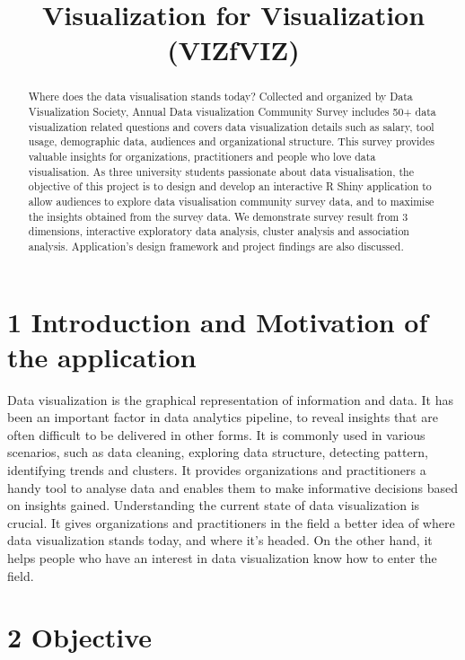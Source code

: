 \documentclass{acm_proc_article-sp}
\title{Visualization for Visualization (VIZfVIZ)}
\author{
\alignauthor Xinyue Bai \\
        \affaddr{}\\
       \email{}
\and \alignauthor Weimin Zhang \\
        \affaddr{}\\
       \email{}
\and \alignauthor Hongting Li \\
        \affaddr{}\\
       \email{}
\and }
\date{}
\begin{document}
\maketitle

\begin{abstract}
Where does the data visualisation stands today? Collected and organized
by Data Visualization Society, Annual Data visualization Community
Survey includes 50+ data visualization related questions and covers data
visualization details such as salary, tool usage, demographic data,
audiences and organizational structure. This survey provides valuable
insights for organizations, practitioners and people who love data
visualisation. As three university students passionate about data
visualisation, the objective of this project is to design and develop an
interactive R Shiny application to allow audiences to explore data
visualisation community survey data, and to maximise the insights
obtained from the survey data. We demonstrate survey result from 3
dimensions, interactive exploratory data analysis, cluster analysis and
association analysis. Application's design framework and project
findings are also discussed.
\end{abstract}

\hypertarget{introduction-and-motivation-of-the-application}{%
\section{1 Introduction and Motivation of the
application}\label{introduction-and-motivation-of-the-application}}

Data visualization is the graphical representation of information and
data. It has been an important factor in data analytics pipeline, to
reveal insights that are often difficult to be delivered in other forms.
It is commonly used in various scenarios, such as data cleaning,
exploring data structure, detecting pattern, identifying trends and
clusters. It provides organizations and practitioners a handy tool to
analyse data and enables them to make informative decisions based on
insights gained. Understanding the current state of data visualization
is crucial. It gives organizations and practitioners in the field a
better idea of where data visualization stands today, and where it's
headed. On the other hand, it helps people who have an interest in data
visualization know how to enter the field.

\hypertarget{objective}{%
\section{2 Objective}\label{objective}}
\end{document}
